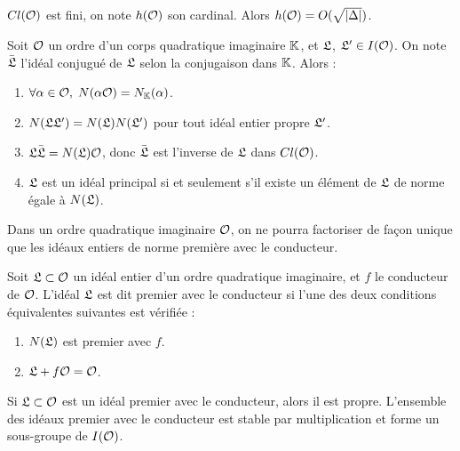\begin{Prop}\label{cardinalGroupeClasse}
	
	$Cl(\mathcal{O})$ est fini, on note $h(\mathcal{O})$ son cardinal. Alors $h(\mathcal{O}) = O(\sqrt{|\Delta|})$.
\end{Prop} 



\begin{Prop}\label{NormesId}
	
	Soit $\mathcal{O}$ un ordre d'un corps quadratique imaginaire $\mathbb{K}$, et $\mathfrak{L}$, $\mathfrak{L}'\in I(\mathcal{O})$. On note $\bar{\mathfrak{L}}$ l'idéal conjugué de $\mathfrak{L}$ selon la conjugaison dans $\mathbb{K}$. Alors :
	\begin{enumerate}
		\item $\forall\alpha\in\mathcal{O},\; N(\alpha\mathcal{O}) = N_{\mathbb{K}}(\alpha)$.
		\item $N(\mathfrak{L}\mathfrak{L}') = N(\mathfrak{L})N(\mathfrak{L}')$ pour tout idéal entier propre $\mathfrak{L}'$.
		\item $\mathfrak{L}\bar{\mathfrak{L}} = N(\mathfrak{L})\mathcal{O}$, donc $\bar{\mathfrak{L}}$ est l'inverse de $\mathfrak{L}$ dans $Cl(\mathcal{O})$.
		\item $\mathfrak{L}$ est un idéal principal si et seulement s'il existe un élément de $\mathfrak{L}$ de norme égale à $N(\mathfrak{L})$.
	\end{enumerate}
\end{Prop}


Dans un ordre quadratique imaginaire $\mathcal{O}$, on ne pourra factoriser de façon unique que les idéaux entiers de norme première avec le conducteur. 

\begin{Def}
	Soit $\mathfrak{L}\subset\mathcal{O}$ un idéal entier d'un ordre quadratique imaginaire, et $f$ le conducteur de $\mathcal{O}$. L'idéal $\mathfrak{L}$ est dit premier avec le conducteur si l'une des deux conditions équivalentes suivantes est vérifiée :
	\begin{enumerate}
		\item $N(\mathfrak{L})$ est premier avec $f$.
		\item $\mathfrak{L} + f\mathcal{O} = \mathcal{O}$.
	\end{enumerate}
\end{Def}

\begin{Prop}
	
	Si $\mathfrak{L}\subset\mathcal{O}$ est un idéal premier avec le conducteur, alors il est propre. L'ensemble des idéaux premier avec le conducteur est stable par multiplication et forme un sous-groupe de $I(\mathcal{O})$.  
\end{Prop}

